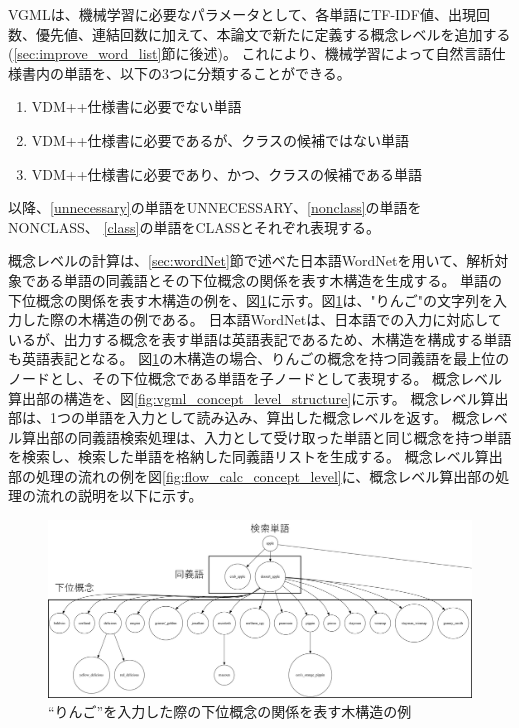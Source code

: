 VGMLは、機械学習に必要なパラメータとして、各単語にTF-IDF値、出現回数、優先値、連結回数に加えて、本論文で新たに定義する概念レベルを追加する(\ref{sec:improve_word_list}節に後述)。
これにより、機械学習によって自然言語仕様書内の単語を、以下の3つに分類することができる。

\begin{enumerate}[label=\textbf{\Alph*}.]
    \item VDM++仕様書に必要でない単語
    \label{unnecessary}
    \item VDM++仕様書に必要であるが、クラスの候補ではない単語
    \label{nonclass}
    \item VDM++仕様書に必要であり、かつ、クラスの候補である単語
    \label{class}
\end{enumerate}

以降、\ref{unnecessary}の単語をUNNECESSARY、\ref{nonclass}の単語をNONCLASS、
\ref{class}の単語をCLASSとそれぞれ表現する。

概念レベルの計算は、\ref{sec:wordNet}節で述べた日本語WordNetを用いて、解析対象である単語の同義語とその下位概念の関係を表す木構造を生成する。
単語の下位概念の関係を表す木構造の例を、図\ref{fig:tree_structure}に示す。図\ref{fig:tree_structure}は、"りんご"の文字列を入力した際の木構造の例である。
日本語WordNetは、日本語での入力に対応しているが、出力する概念を表す単語は英語表記であるため、木構造を構成する単語も英語表記となる。
図\ref{fig:tree_structure}の木構造の場合、りんごの概念を持つ同義語を最上位のノードとし、その下位概念である単語を子ノードとして表現する。
概念レベル算出部の構造を、図\ref{fig:vgml_concept_level_structure}に示す。
概念レベル算出部は、1つの単語を入力として読み込み、算出した概念レベルを返す。
概念レベル算出部の同義語検索処理は、入力として受け取った単語と同じ概念を持つ単語を検索し、検索した単語を格納した同義語リストを生成する。
概念レベル算出部の処理の流れの例を図\ref{fig:flow_calc_concept_level}に、概念レベル算出部の処理の流れの説明を以下に示す。

\begin{figure}[t]
    \begin{center}
        \includegraphics[width=1.0\columnwidth]{image/tree_structure.png}
        \caption{``りんご''を入力した際の下位概念の関係を表す木構造の例}
        \label{fig:tree_structure}
    \end{center}
\end{figure}

